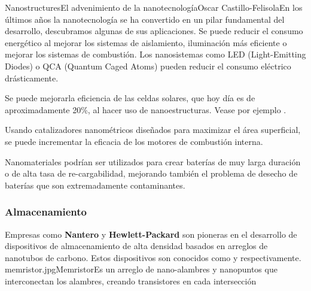 \begin{article}{Nanostructures}{El advenimiento de la nanotecnolog\'ia}{Oscar Castillo-Felisola}{En los \'ultimos a\~nos la nanotecnolog\'ia se ha convertido en un pilar fundamental del desarrollo, descubramos algunas de sus aplicaciones.}
Se puede reducir el consumo energ\'etico al mejorar los sistemas de aislamiento, iluminaci\'on m\'as eficiente o mejorar los sistemas de combusti\'on. Los nanosistemas como LED (Light-Emitting Diodes) o QCA (Quantum Caged Atoms) pueden reducir el consumo el\'ectrico dr\'asticamente.

Se puede mejorarla eficiencia de las celdas solares, que hoy d\'ia es de aproximadamente 20\%, al hacer uso de nanoestructuras. Vease por ejemplo .

Usando catalizadores nanom\'etricos dise\~nados para maximizar el \'area superficial, se puede incrementar la eficacia de los motores de combusti\'on interna.

Nanomateriales podr\'ian ser utilizados para crear bater\'ias de  muy larga duraci\'on o de alta tasa de re-cargabilidad, mejorando tambi\'en el problema de desecho de bater\'ias que son extremadamente contaminantes.



\subsubsection*{Almacenamiento}
Empresas como {\bf Nantero} y {\bf Hewlett-Packard} son pioneras en el desarrollo de dispositivos de almacenamiento de alta densidad basados en arreglos de nanotubos de carbono. Estos dispositivos son conocidos como  y  respectivamente.
\Bild%
    {memristor.jpg}{Memristor}{Es un arreglo de nano-alambres y nanopuntos que interconectan los alambres, creando transistores en cada intersecci\'on}


\end{article}
